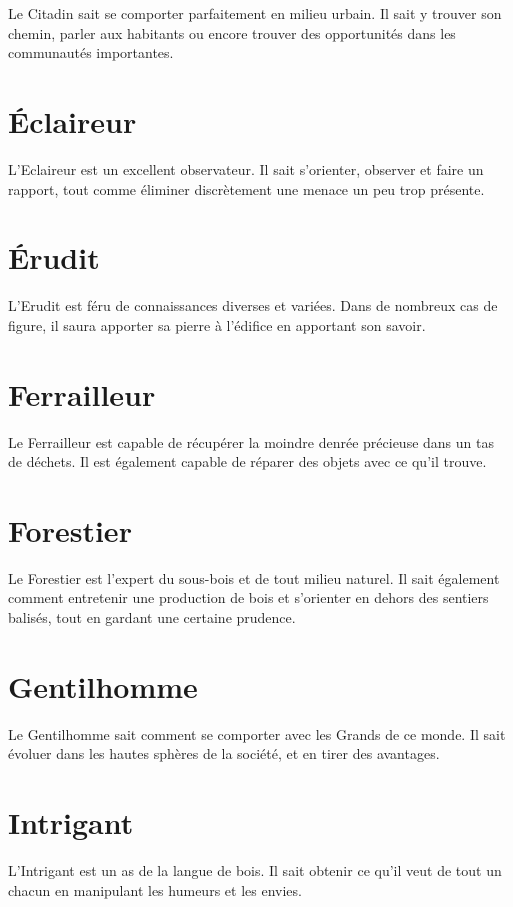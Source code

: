 \documentclass[a4paper,10pt,twoside,twocolumn,openany,bg=print,justified]{dndbook}
\begin{document}
Le Citadin sait se comporter parfaitement en milieu urbain. Il sait y trouver son chemin, parler aux habitants ou encore trouver des opportunités dans les communautés importantes.

\section*{Éclaireur}

L'Eclaireur est un excellent observateur. Il sait s'orienter, observer et faire un rapport, tout comme éliminer discrètement une menace un peu trop présente.

\section*{Érudit}

L'Erudit est féru de connaissances diverses et variées. Dans de nombreux cas de figure, il saura apporter sa pierre à l'édifice en apportant son savoir.

\section*{Ferrailleur}

Le Ferrailleur est capable de récupérer la moindre denrée précieuse dans un tas de déchets. Il est également capable de réparer des objets avec ce qu'il trouve.

\section*{Forestier}

Le Forestier est l'expert du sous-bois et de tout milieu naturel. Il sait également comment entretenir une production de bois et s'orienter en dehors des sentiers balisés, tout en gardant une certaine prudence.

\section*{Gentilhomme}

Le Gentilhomme sait comment se comporter avec les Grands de ce monde. Il sait évoluer dans les hautes sphères de la société, et en tirer des avantages.

\section*{Intrigant}

L'Intrigant est un as de la langue de bois. Il sait obtenir ce qu'il veut de tout un chacun en manipulant les humeurs et les envies.
\end{document}

